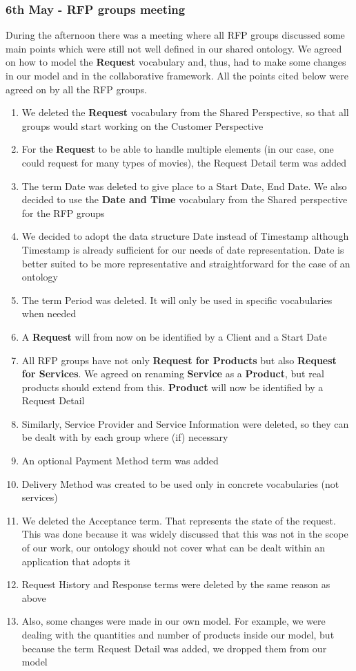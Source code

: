 \documentclass[a4paper,10pt]{article}
\begin{document}
\subsubsection*{6th May - RFP groups meeting}
During the afternoon there was a meeting where all RFP groups discussed some main points which were still not well defined in our shared ontology. We agreed on how to model the \textbf{Request} vocabulary and, thus, had to make some changes in our model and in the collaborative framework. All the points cited below were agreed on by all the RFP groups.
\begin{enumerate}
  \item We deleted the \textbf{Request} vocabulary from the Shared Perspective, so that all groups would start working on the Customer Perspective
  \item For the \textbf{Request} to be able to handle multiple elements (in our case, one could request for many types of movies), the Request Detail term was added
  \item The term Date was deleted to give place to a Start Date, End Date. We also decided to use the \textbf{Date and Time} vocabulary from the Shared perspective for the RFP groups
  \item We decided to adopt the data structure Date instead of Timestamp although Timestamp is already sufficient for our needs of date representation. Date is better suited to be more representative  and straightforward for the case of an ontology
  \item The term Period was deleted. It will only be used in specific vocabularies when needed
  \item A \textbf{Request} will from now on be identified by a Client and a Start Date
  \item All RFP groups have not only \textbf{Request for Products} but also \textbf{Request for Services}. We agreed on renaming \textbf{Service} as a \textbf{Product}, but real products should extend from this. \textbf{Product} will now be identified by a Request Detail
  \item Similarly, Service Provider and Service Information were deleted, so they can be dealt with by each group where (if) necessary
  \item An optional Payment Method term was added
  \item Delivery Method was created to be used only in concrete vocabularies (not services)
  \item We deleted the Acceptance term. That represents the state of the request. This was done because it was widely discussed that this was not in the scope of our work, our ontology should not cover what can be dealt within an application that adopts it
  \item Request History and Response terms were deleted by the same reason as above
  \item Also, some changes were made in our own model. For example, we were dealing with the quantities and number of products inside our model, but because the term Request Detail was added, we dropped them from our model
\end{enumerate}
\end{document}

